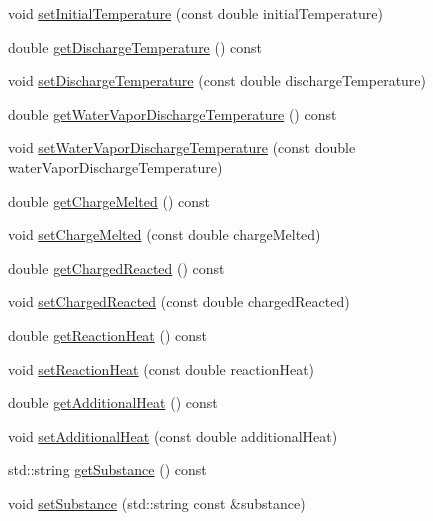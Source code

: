 \begin{DoxyCompactItemize}
void \hyperlink{class_solid_load_charge_material_ac80e565d26e68e542f4cb41f41b7d96c}{set\+Initial\+Temperature} (const double initial\+Temperature)
\item 
double \hyperlink{class_solid_load_charge_material_afcb8c00c2e23ad1444f34960b19835a0}{get\+Discharge\+Temperature} () const
\item 
void \hyperlink{class_solid_load_charge_material_adf73bc8d656a501cae5ad68af7a7c4fb}{set\+Discharge\+Temperature} (const double discharge\+Temperature)
\item 
double \hyperlink{class_solid_load_charge_material_a267f26d42f8ba2655c09f561fc0f6cb1}{get\+Water\+Vapor\+Discharge\+Temperature} () const
\item 
void \hyperlink{class_solid_load_charge_material_af7837868e494c16aba5a2c3e1220106d}{set\+Water\+Vapor\+Discharge\+Temperature} (const double water\+Vapor\+Discharge\+Temperature)
\item 
double \hyperlink{class_solid_load_charge_material_ad9ab52fe5861f48b763fe300851df69a}{get\+Charge\+Melted} () const
\item 
void \hyperlink{class_solid_load_charge_material_a9999a2976e8a8662a86cc2a159df5202}{set\+Charge\+Melted} (const double charge\+Melted)
\item 
double \hyperlink{class_solid_load_charge_material_a7c7f05b6ee14eb5f07e5c48c30e9c7a1}{get\+Charged\+Reacted} () const
\item 
void \hyperlink{class_solid_load_charge_material_a38f3b832ff29f779a78a51fd7352fcd4}{set\+Charged\+Reacted} (const double charged\+Reacted)
\item 
double \hyperlink{class_solid_load_charge_material_a3481dc84063babc3514a4173e6bd9341}{get\+Reaction\+Heat} () const
\item 
void \hyperlink{class_solid_load_charge_material_a9c3cd28b2b31fb66eea984d9030cd247}{set\+Reaction\+Heat} (const double reaction\+Heat)
\item 
double \hyperlink{class_solid_load_charge_material_a0fde17a84b10bb75bf78227548fbf26c}{get\+Additional\+Heat} () const
\item 
void \hyperlink{class_solid_load_charge_material_a849fd29a3ecb95be2e9d34f9280b1b94}{set\+Additional\+Heat} (const double additional\+Heat)
\item 
std\+::string \hyperlink{class_solid_load_charge_material_ade525be6bb8cb86405daeb61d45311f9}{get\+Substance} () const
\item 
void \hyperlink{class_solid_load_charge_material_aebe376ab016f48678c3a70390b4ea52a}{set\+Substance} (std\+::string const \&substance)

\end{DoxyCompactItemize}
